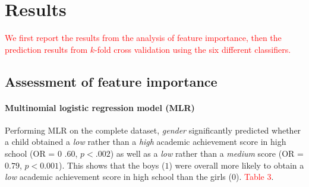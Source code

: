 \documentclass[10pt,letterpaper]{article}
\begin{document}
{{%

\vspace{5mm}


\section*{Results}

\textcolor{red}{We first report the results from the analysis of feature importance, then the prediction results from $k$-fold cross validation using the six different classifiers.}

\subsection*{Assessment of feature importance} 


\paragraph{Multinomial logistic regression model (MLR)}


Performing MLR on the complete dataset, {\it gender} significantly predicted whether a child obtained a {\it low} rather than a {\it high} academic achievement score in high school (OR = 0 .60, $p < .002$) as well as a {\it low} rather than a {\it medium} score (OR = $0.79$, $p < 0.001$). This shows that the boys ($1$) were overall more likely to obtain a {\it low} academic achievement score in high school than the girls ($0$). \textcolor{red}{Table 3}. 

}}
\end{document}
